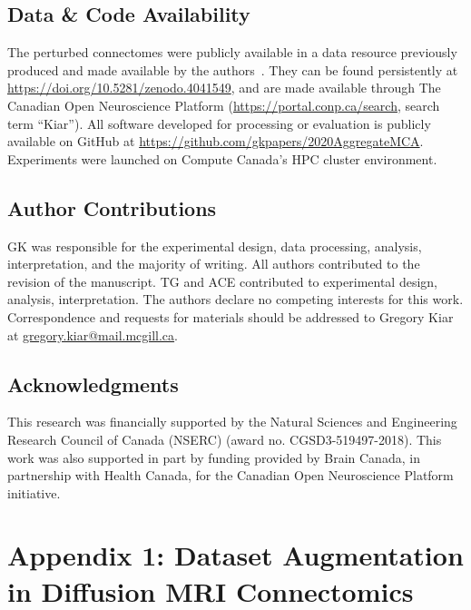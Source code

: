 \documentclass[10pt]{SelfArx} %
\begin{document}
\subsection*{Data \& Code Availability}
The perturbed connectomes were publicly available in a data resource previously produced and made available by the
authors~\cite{Kiar2020-yz}. They can be found persistently at \url{https://doi.org/10.5281/zenodo.4041549}, and are
made available through The Canadian Open Neuroscience Platform (\url{https://portal.conp.ca/search}, search term
``Kiar''). All software developed for processing or evaluation is publicly available on GitHub at
\url{https://github.com/gkpapers/2020AggregateMCA}. Experiments were launched on Compute Canada's HPC cluster
environment. 

\subsection*{Author Contributions}
GK was responsible for the experimental design, data processing, analysis, interpretation, and the majority of writing.
All authors contributed to the revision of the manuscript. TG and ACE contributed to experimental design, analysis,
interpretation. The authors declare no competing interests for this work. Correspondence and requests for materials
should be addressed to Gregory Kiar at \url{gregory.kiar@mail.mcgill.ca}.

\subsection*{Acknowledgments} 
This research was financially supported by the Natural Sciences and Engineering Research Council of Canada (NSERC)
(award no. CGSD3-519497-2018). This work was also supported in part by funding provided by Brain Canada, in partnership
with Health Canada, for the Canadian Open Neuroscience Platform initiative.




\clearpage
\onecolumn
\section*{Appendix 1: Dataset Augmentation in Diffusion MRI Connectomics}
\label{app:augmentation}
\end{document}

